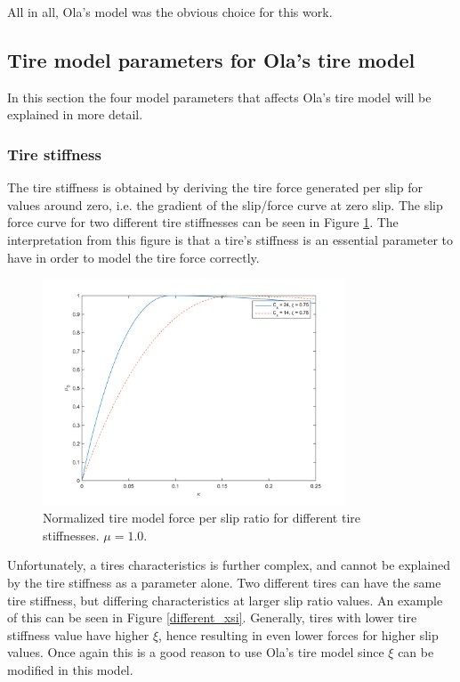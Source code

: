 All in all, Ola's model was the obvious choice for this work.

\subsection{Tire model parameters for Ola's tire model}
In this section the four model parameters that affects Ola's tire model will be explained in more detail.

\subsubsection{Tire stiffness}
The tire stiffness is obtained by deriving the tire force generated per slip for values around zero, i.e. the gradient of the slip/force curve at zero slip. The slip force curve for two different tire stiffnesses can be seen in Figure \ref{different_cx}. The interpretation from this figure is that a tire's stiffness is an essential parameter to have in order to model the tire force correctly. 

\begin{figure}[h]
	\centering
	\includegraphics[width=0.8\textwidth]{Pictures/slipkraft_olika_cx}
	\caption {Normalized tire model force per slip ratio for different tire stiffnesses. $ \mu = 1.0 $.}
	\label{different_cx}
\end{figure}

Unfortunately, a tires characteristics is further complex, and cannot be explained by the tire stiffness as a parameter alone. Two different tires can have the same tire stiffness, but differing characteristics at larger slip ratio values. An example of this can be seen in Figure \ref{different_xsi}. Generally, tires with lower tire stiffness value have higher $ \xi $, hence resulting in even lower forces for higher slip values. Once again this is a good reason to use Ola's tire model since $ \xi $ can be modified in this model.

